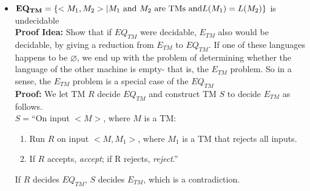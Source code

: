\documentclass[a4paper]{article}
\begin{document}
\begin{itemize}
    {\bf Proof idea:} We assume that $REGULAR_{TM}$ is decidable by a TM $R$ and use this assumption to construct a TM $S$ that decides $A_{TM}$. The idea is for $S$ to take its input $<M,w>$ and modify $M$ so that the resulting TM recognizes a regular language iff M accepts $w$. We call the modified machine $M_2$. We design $M_2$ to recognize the nonregular language $\left\{ 0^n1^n|n\geq0 \right\}$ if $M$ does not accept $w$. \\
    {\bf Proof:} We let $R$ be a TM that decides $REGULAR_{TM}$ and construct TM $S$ to decide $A_{TM}$. Then $S$ works in the following manner: \\
    $S="$On input $<M,w>$, where $M$ is a TM and $w$ is a string:\\
    \begin{enumerate}[{\bf 1.}]
      \item Construct the following TM $M_2$. \\
        $M_2=$'On input $x$: \\
        \begin{enumerate}
          \item If $x$ has the form $0^n1^n$, \emph{accept}.
          \item If $x$ does not have this form, run $M$ on input $w$ and accept if $M$ accepts $w$.'
        \end{enumerate}
      \item Run $R$ on input $<M_2>$.
      \item If $R$ accepts, \emph{accept}; if $R$ rejects, \emph{reject}.''
    \end{enumerate}
   \item ${\bf EQ_{TM}} =\left\{ <M_1,M_2>|M_1 \text{ and }M_2 \text{ are TMs and} 
     L(M_1)=L(M_2)\right\}$ is undecidable \\
    {\bf Proof Idea: }Show that if $EQ_{TM}$ were decidable, $E_{TM}$ also would be decidable, by giving a reduction from $E_{TM}$ to $EQ_{TM}$. If one of these languages happens to be $\varnothing$, we end up with the problem of determining whether the language of the other machine is empty- that is, the $E_{TM}$ problem. So in a sense, the $E_{TM}$ problem is a special case of the $EQ_{TM}$ \\
    {\bf Proof:} We let TM $R$ decide $EQ_{TM}$ and construct TM $S$ to decide $E_{TM}$ as follows. \\
    $S=$``On input $<M>$, where $M$ is a TM: \\
    \begin{enumerate}[{\bf 1.}]
      \item Run $R$ on input $<M,M_1>$, where $M_1$ is a TM that rejects all inputs.
      \item If $R$ accepts, \emph{accept}; if R rejects, \emph{reject}.''
    \end{enumerate}
    If $R$ decides $EQ_{TM}$, $S$ decides $E_{TM}$, which is a contradiction.
\end{itemize}
\end{document}
